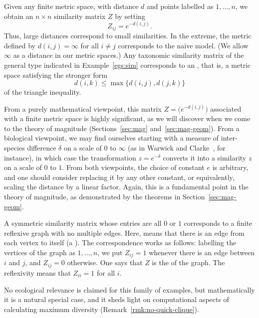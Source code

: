 \begin{example}
Given any finite metric space, with distance $d$ and points labelled as $1,
\ldots, n$, we obtain an $n \times n$ similarity matrix $Z$ by setting
\[
Z_{ij} = e^{-d(i, j)}.
\]
Thus, large distances correspond to small similarities.  In the extreme,
the metric defined by $d(i, j) = \infty$ for all $i \neq j$ corresponds to
the naive model.  (We allow $\infty$ as a distance in our metric spaces.)
Any taxonomic similarity matrix of the general type indicated in
Example~\ref{egs:sim} corresponds to an
,%
%
% 
that is, a metric space satisfying the stronger form
\[
d(i, k) \leq \max \{ d(i, j), d(j, k) \}
\]
of the triangle inequality.

From a purely mathematical viewpoint, this matrix $Z = \bigl(e^{-d(i,
  j)}\bigr)$ associated with a finite metric space is highly significant,
as we will discover when we come to the theory of magnitude
(Sections~\ref{sec:mag} and~\ref{sec:mag-geom}).  From a biological
viewpoint, we may find ourselves starting with a measure of inter-species
difference $\delta$ on a scale of $0$ to $\infty$ (as in Warwick and
Clarke~\cite{WaCl}, for instance), in which case the transformation $z =
e^{-\delta}$ converts it into a similarity $z$ on a scale of $0$ to $1$.
From both viewpoints, the choice of constant $e$ is arbitrary, and one
should consider replacing it by any other constant, or equivalently,
scaling the distance by a linear factor.  Again, this is a fundamental
point in the theory of magnitude, as demonstrated by the theorems in
Section~\ref{sec:mag-geom}.
\end{example}

\begin{example}
A symmetric similarity matrix whose entries are all $0$ or $1$ corresponds
to a finite reflexive graph%
%
% 
with no multiple edges.  Here, %
%
%
% 
means that there is an edge from each vertex to itself (a ).%
%
% 
The correspondence works as follows: labelling the vertices of the graph as
$1, \ldots, n$, we put $Z_{ij} = 1$ whenever there is an edge between $i$
and $j$, and $Z_{ij} = 0$ otherwise.  One says that $Z$ is the
 of the graph.  The reflexivity means that $Z_{ii} = 1$ for all
$i$.

No ecological relevance is claimed for this family of examples, but
mathematically it is a natural special case, and it sheds light on 
computational aspects of calculating maximum diversity
(Remark~\ref{rmk:no-quick-clique}).
\end{example}

